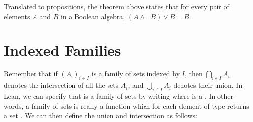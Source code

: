 \documentclass[letterpaper,10pt,english]{sphinxmanual}
\begin{document}
\begin{sphinxVerbatim}[commandchars=\\\{\}]
           
                  \PYG{o}{[}\PYG{o}{]}
                           \PYG{o}{[}\PYG{o}{]}
                                  \PYG{o}{[}\PYG{o}{]}
\end{sphinxVerbatim}

\sphinxAtStartPar
Translated to propositions, the theorem above states that for every pair of elements \(A\) and \(B\) in a Boolean algebra, \((A \wedge \neg B) \vee B = B\).


\section{Indexed Families}
\label{\detokenize{sets_in_lean:indexed-families}}
\sphinxAtStartPar
Remember that if \((A_i)_{i \in I}\)
is a family of sets indexed by \(I\),
then \(\bigcap_{i \in I} A_i\) denotes the intersection of all the sets \(A_i\), and \(\bigcup_{i \in I} A_i\) denotes their union.
In Lean, we can specify that  is a family of sets by writing
 where  is a .
In other words, a family of sets is really a function which for each element
 of type  returns a set .
We can then define the union and intersection as follows:
\end{document}
